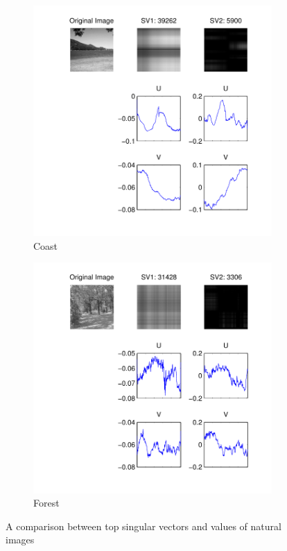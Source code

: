 \documentclass{report}
\begin{document}
\begin{figure}[H]
        \centering
        \begin{subfigure}[b]{0.48\textwidth}
                \includegraphics[width=\textwidth]{graphics/singular_vectors_coast.pdf}
                \caption{Coast}
        \end{subfigure}
        \begin{subfigure}[b]{0.48\textwidth}
                \includegraphics[width=\textwidth]{graphics/singular_vectors_forest.pdf}
                \caption{Forest}
        \end{subfigure}
        \caption{A comparison between top singular vectors and values of natural images}
        \label{fig:natural_vectors}
\end{figure}
\end{document}
